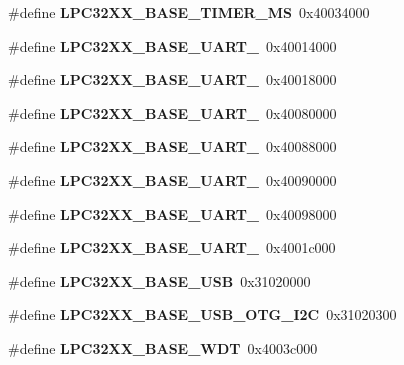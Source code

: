 \begin{DoxyCompactItemize}
\mbox{\label{group__lpc32xx__reg_ga7cea321de3fff29eb62b4ac085fe0f20}} 
\#define {\bfseries L\+P\+C32\+X\+X\+\_\+\+B\+A\+S\+E\+\_\+\+T\+I\+M\+E\+R\+\_\+\+MS}~0x40034000
\item 
\mbox{\label{group__lpc32xx__reg_ga7a1e82abdb255ac37187294f67561a3c}} 
\#define {\bfseries L\+P\+C32\+X\+X\+\_\+\+B\+A\+S\+E\+\_\+\+U\+A\+R\+T\+\_}~0x40014000
\item 
\mbox{\label{group__lpc32xx__reg_gab8cf9ffa35126e660eddcedff2cef35e}} 
\#define {\bfseries L\+P\+C32\+X\+X\+\_\+\+B\+A\+S\+E\+\_\+\+U\+A\+R\+T\+\_}~0x40018000
\item 
\mbox{\label{group__lpc32xx__reg_ga4fbbc2bd2f37aa7143c7d7c399b52232}} 
\#define {\bfseries L\+P\+C32\+X\+X\+\_\+\+B\+A\+S\+E\+\_\+\+U\+A\+R\+T\+\_}~0x40080000
\item 
\mbox{\label{group__lpc32xx__reg_ga9dcfafd86cdd26db7a80106a179365c2}} 
\#define {\bfseries L\+P\+C32\+X\+X\+\_\+\+B\+A\+S\+E\+\_\+\+U\+A\+R\+T\+\_}~0x40088000
\item 
\mbox{\label{group__lpc32xx__reg_ga77fe0763ba9f817cf1ecdba7441eb183}} 
\#define {\bfseries L\+P\+C32\+X\+X\+\_\+\+B\+A\+S\+E\+\_\+\+U\+A\+R\+T\+\_}~0x40090000
\item 
\mbox{\label{group__lpc32xx__reg_gad0c04c12d5605c741f541176620fc3b0}} 
\#define {\bfseries L\+P\+C32\+X\+X\+\_\+\+B\+A\+S\+E\+\_\+\+U\+A\+R\+T\+\_}~0x40098000
\item 
\mbox{\label{group__lpc32xx__reg_ga030d1b543393b35456fb0eb02bd945a5}} 
\#define {\bfseries L\+P\+C32\+X\+X\+\_\+\+B\+A\+S\+E\+\_\+\+U\+A\+R\+T\+\_}~0x4001c000
\item 
\mbox{\label{group__lpc32xx__reg_gaed8c688761eac4be96c3b607ae5d43fe}} 
\#define {\bfseries L\+P\+C32\+X\+X\+\_\+\+B\+A\+S\+E\+\_\+\+U\+SB}~0x31020000
\item 
\mbox{\label{group__lpc32xx__reg_ga52bc3069c17c78a454cac7bb6540f9a2}} 
\#define {\bfseries L\+P\+C32\+X\+X\+\_\+\+B\+A\+S\+E\+\_\+\+U\+S\+B\+\_\+\+O\+T\+G\+\_\+\+I2C}~0x31020300
\item 
\mbox{\label{group__lpc32xx__reg_gaade513e48ef426a5d3745f9c33dd195c}} 
\#define {\bfseries L\+P\+C32\+X\+X\+\_\+\+B\+A\+S\+E\+\_\+\+W\+DT}~0x4003c000
\end{DoxyCompactItemize}
